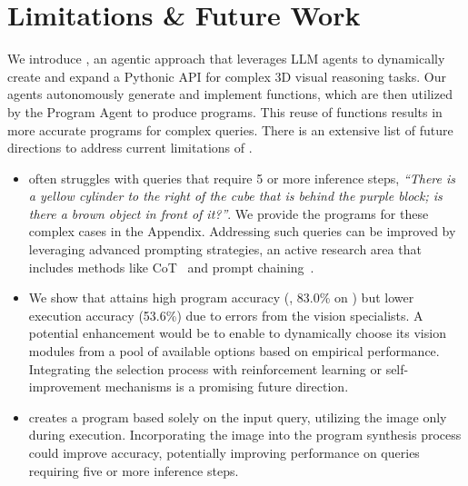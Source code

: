 \section{Limitations \& Future Work}
\label{sec:conclusion}
We introduce \method, an agentic approach that leverages LLM agents to dynamically create and expand a Pythonic API for complex 3D visual reasoning tasks. Our agents autonomously generate and implement functions, which are then utilized by the Program Agent to produce programs. This reuse of functions results in more accurate programs for complex queries.
There is an extensive list of future directions to address current limitations of \method.
\begin{itemize}
\item \method often struggles with queries that require 5 or more inference steps, \eg \emph{“There is a yellow cylinder to the right of the cube that is behind the purple block; is there a brown object in front of it?”}. We provide the programs for these complex cases in the Appendix. Addressing such queries can be improved by leveraging advanced prompting strategies, an active research area that includes methods like CoT~\cite{cot} and prompt chaining~\cite{promptchainer, aichains}.
\item We show that \method attains high program accuracy (\eg, 83.0\% on \clevr) but lower execution accuracy (53.6\%) due to errors from the vision specialists. A potential enhancement would be to enable \method to dynamically choose its vision modules from a pool of available options based on empirical performance. Integrating the selection process with reinforcement learning or self-improvement mechanisms is a promising future direction.
\item \method creates a program based solely on the input query, utilizing the image only during execution. Incorporating the image into the program synthesis process could improve accuracy, potentially improving performance on queries requiring five or more inference steps.
\end{itemize}
